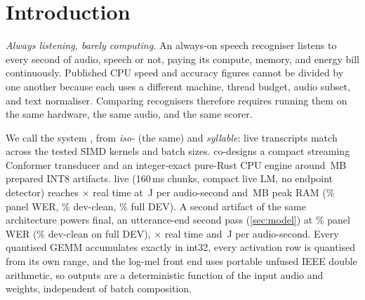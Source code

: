 \section{Introduction}\label{sec:intro}

\emph{Always listening, barely computing.} An always-on speech recogniser listens to every second of
audio, speech or not, paying its compute, memory, and energy bill continuously. Published CPU speed
and accuracy figures cannot be divided by one another because each uses a different machine, thread
budget, audio subset, and text normaliser. Comparing recognisers therefore requires running them on
the same hardware, the same audio, and the same scorer.

%
 We call the system \ultra{}, from \emph{iso-} (the same) and \emph{syllable}:
live transcripts match across the tested SIMD kernels and batch sizes. \ultra{} co-designs a compact
streaming Conformer transducer and an integer-exact pure-Rust CPU engine around
\ColdHeadModel\,MB prepared INT8 artifacts. \ultra{} live (160\,ms chunks, compact live LM, no endpoint
detector) reaches \ColdLiveSpeed$\times$ real time at \ColdLiveWatts\,J per audio-second and
\ColdLiveRss\,MB peak RAM (\ColdLiveWer\% panel WER, \ColdVFourLiveLmWerClean\% dev-clean, \LookLiveFullWer\% full DEV). A second artifact of the
same architecture powers \ultra{} final, an utterance-end second pass (\cref{sec:model}) at \ColdHeadWer\% panel WER
(\FinFullClean\% dev-clean on full DEV), \ColdHeadSpeed$\times$ real time and \ColdHeadWatts\,J per audio-second.
Every quantised GEMM accumulates exactly in int32, every activation row is quantised from its own
range, and the log-mel front end uses portable unfused IEEE double arithmetic, so outputs are a
deterministic function of the input audio and weights, independent of batch composition.

